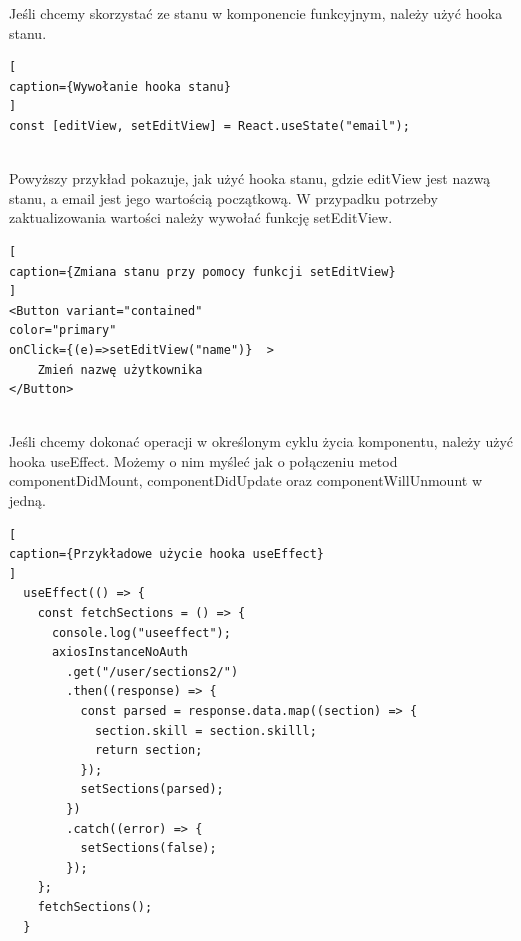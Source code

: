 \documentclass[oneside,polski,logo,indent]{amuthesis}
\begin{document}
Jeśli chcemy skorzystać ze stanu w komponencie funkcyjnym, należy użyć hooka stanu.


\begin{lstlisting}[
caption={Wywołanie hooka stanu}
]
const [editView, setEditView] = React.useState("email");


\end{lstlisting}

Powyższy przykład pokazuje, jak użyć hooka stanu, gdzie editView jest nazwą stanu, a email jest jego wartością początkową. W przypadku potrzeby zaktualizowania wartości należy 
wywołać funkcję setEditView.


\begin{lstlisting}[
caption={Zmiana stanu przy pomocy funkcji setEditView}
]
<Button variant="contained" 
color="primary" 
onClick={(e)=>setEditView("name")}  >
	Zmień nazwę użytkownika
</Button>


\end{lstlisting}

Jeśli chcemy dokonać operacji w określonym cyklu życia komponentu, należy użyć hooka useEffect. Możemy o nim myśleć jak o połączeniu metod componentDidMount, componentDidUpdate oraz componentWillUnmount w jedną.


\begin{lstlisting}[
caption={Przykładowe użycie hooka useEffect}
]
  useEffect(() => {
    const fetchSections = () => {
      console.log("useeffect");
      axiosInstanceNoAuth
        .get("/user/sections2/")
        .then((response) => {
          const parsed = response.data.map((section) => {
            section.skill = section.skilll;
            return section;
          });
          setSections(parsed);
        })
        .catch((error) => {
          setSections(false);
        });
    };
    fetchSections();
  }


\end{lstlisting}
\end{document}
